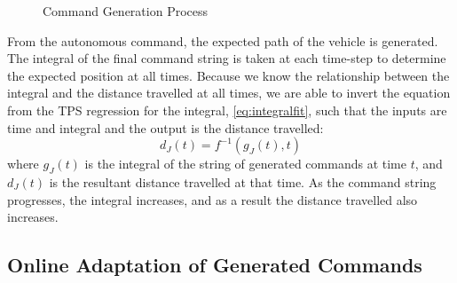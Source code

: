 \documentclass[letterpaper, 10 pt, conference]{ieeeconf}  %
\newcommand\NB[1]{$\spadesuit$\footnote{NB: #1}}
\begin{document}
\begin{figure}[h]
	\centering
	\caption{Command Generation Process}
	\label{fig:gensample}
\end{figure}

From the autonomous command, the expected path of the vehicle is generated. The integral of the final command string is taken at each time-step to determine the expected position at all times. Because we know the relationship between the integral and the distance travelled at all times, we are able to invert the equation from the TPS regression for the integral, \eqref{eq:integralfit}, such that the inputs are time and integral and the output is the distance travelled:
\begin{equation} \label{eq:distresult}
d_J(t) = f^{-1}(g_J(t),t)
\end{equation}
where $g_J(t)$ is the integral of the string of generated commands at time $t$, and $d_J(t)$ is the resultant distance travelled at that time. As the command string progresses, the integral increases, and as a result the distance travelled also increases.

\subsection{Online Adaptation of Generated Commands} \label{sec:adapt}
\end{document}
